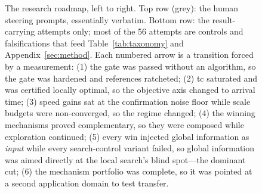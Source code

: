 \documentclass{SciPost}
\begin{document}
\begin{appendix}
\begin{figure}[p]
{}
  \caption{The research roadmap, left to right. Top row (grey): the
  human steering prompts, essentially verbatim. Bottom row: the
  result-carrying attempts only; most of the 56 attempts are controls
  and falsifications that feed Table~\ref{tab:taxonomy} and
  Appendix~\ref{sec:method}. Each numbered arrow is a transition forced by
  a measurement: (1) the gate was passed without an algorithm, so the
  gate was hardened and references ratcheted; (2) tc saturated and was
  certified locally optimal, so the objective axis changed to arrival
  time; (3) speed gains sat at the confirmation noise floor while scale
  budgets were non-converged, so the regime changed; (4) the winning
  mechanisms proved complementary, so they were composed while
  exploration continued; (5) every win injected global information as
  \emph{input} while every search-control variant failed, so global
  information was aimed directly at the local search's blind spot---the
  dominant cut; (6) the mechanism portfolio was complete, so it was
  pointed at a second application domain to test transfer.}
  \label{fig:roadmap}
\end{figure}

\end{appendix}


\end{document}
